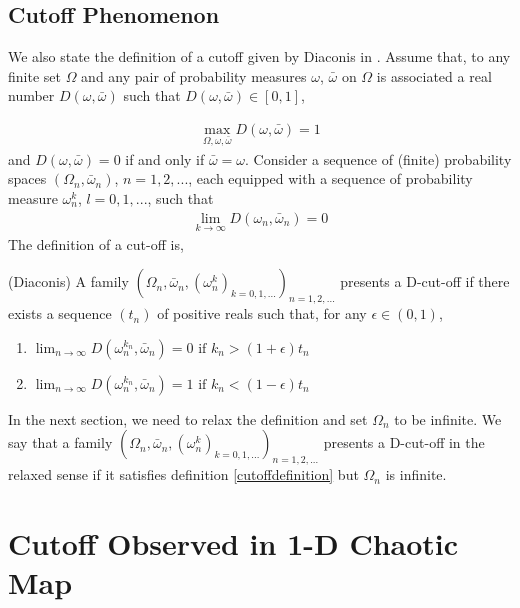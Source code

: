 \subsection{Cutoff Phenomenon}
We also state the definition of a cutoff given by Diaconis in
\cite{Diaconis2005}. Assume that, to any finite set $\Omega$ and any
pair of probability measures $\omega$, $\bar{\omega}$ on $\Omega$ is associated
a real number $D(\omega,\bar{\omega})$ such that $D(\omega,\bar{\omega})\in [0,1]$,

\begin{eqnarray}
\max_{\Omega,\omega,\bar{\omega}} D(\omega,\bar{\omega}) = 1
\end{eqnarray}
and $D(\omega,\bar{\omega})=0$ if and only if $\bar{\omega}=\omega$. Consider a sequence of
(finite) probability spaces $(\Omega_n,\bar{\omega}_n)$, $n=1,2,...$, each
equipped with a sequence of probability measure $\omega^k_n$,
$l=0,1,...$, such that
\begin{eqnarray}
\lim_{k \rightarrow \infty} D(\omega_n,\bar{\omega}_n)=0
\end{eqnarray}
The definition of a cut-off is,

\begin{definition}
\label{cutoffdefinition}
(Diaconis) A family $(\Omega_n,\bar{\omega}_n, (\omega^k_n)_{k=0,1,...})_{n=1,2,...}$
presents a D-cut-off if there exists a sequence $(t_n)$ of positive
reals such that, for any $\epsilon \in(0,1)$,
\begin{enumerate}
  \item $\lim_{n \rightarrow \infty}D(\omega^{k_n}_n,\bar{\omega}_n) = 0 \mbox{ if }
  k_n>(1+\epsilon)t_n$
  \item $\lim_{n \rightarrow \infty}D(\omega^{k_n}_n,\bar{\omega}_n) = 1 \mbox{ if }
  k_n<(1-\epsilon)t_n $
\end{enumerate}
\end{definition}

In the next section, we need to relax the definition and set $\Omega_n$ to be infinite. We say that a family $(\Omega_n,\bar{\omega}_n, (\omega^k_n)_{k=0,1,...})_{n=1,2,...}$ presents a D-cut-off in the relaxed sense if it satisfies definition \ref{cutoffdefinition} but $\Omega_n$ is infinite. 


\section{Cutoff Observed in 1-D Chaotic Map}


